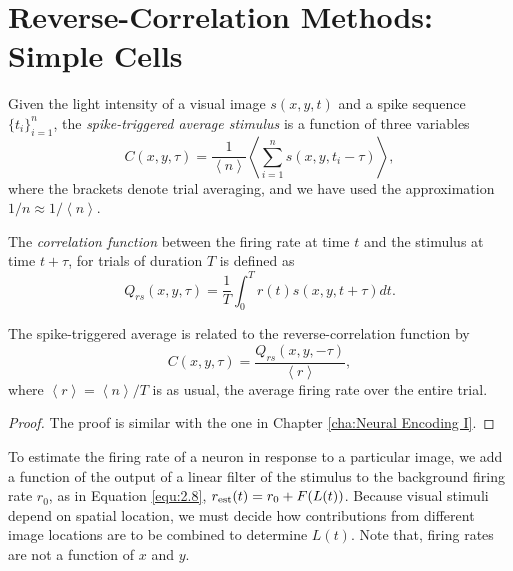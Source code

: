 \section{Reverse-Correlation Methods: Simple Cells}
\label{sec:ReverseCorrelationMethodsForSimpleCells}
\begin{defn}
  \label{def: spikeTriggeredAverage}
  Given the light intensity of a visual image $s(x,y,t)$ and a spike sequence $\{t_i\}_{i = 1}^n$, the \emph{spike-triggered average stimulus}  is a function of three variables
  \begin{equation}
    \label{equ:2.21}
    C(x,y,\tau) = \frac{1}{\left<n\right>}\left<\sum\limits_{i = 1}^ns(x,y,t_i-\tau)\right>,
  \end{equation}
  where the brackets denote trial averaging, and we have used the approximation $1/n \approx 1/\left<n\right>$.
\end{defn}

\begin{defn}
  \label{def:crrelationFuncForVisual}
  The \emph{correlation function} between the firing rate at time $t$ and the stimulus at time $t+\tau$, for trials of duration $T$ is defined as
  \begin{equation}
    \label{equ:2.22}
    Q_{rs}(x,y,\tau) = \frac{1}{T}\int_0^Tr(t) s(x,y,t+\tau)dt.
  \end{equation}
\end{defn}

\begin{prop}
  \label{prop:CQ_relation}
  The spike-triggered average is related to the reverse-correlation function by
  \begin{equation}
    \label{equ:2.23}
    C(x,y,\tau) = \frac{Q_{rs}(x,y,-\tau)}{\left<r\right>},
  \end{equation}
  where $\left<r\right> = \left<n\right>/T$ is as usual, the average firing rate over the entire trial.
\end{prop}
\begin{proof}
  The proof is similar with the one in Chapter \ref{cha:Neural Encoding I}.
\end{proof}

\begin{rem}
  To estimate the firing rate of a neuron in response to a particular image, we add a function of the output of a linear filter of the stimulus to the background firing rate $r_0$, as in Equation \ref{equ:2.8}, $r_{\rm{est}}(t) = r_0 + F(L(t))$. Because visual stimuli depend on spatial location, we must decide how contributions from different image locations are to be combined to determine $L(t)$. Note that, firing rates are not a function of $x$ and $y$.
\end{rem}

